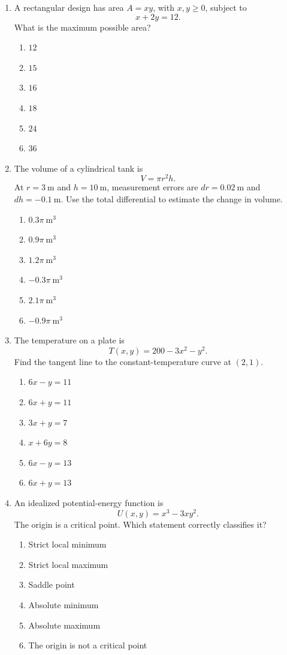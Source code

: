 \documentclass[a4paper,12pt]{article}
\theoremstyle{mystyle}
\numberwithin{equation}{section}
\numberwithin{theorem}{section}
\numberwithin{proposition}{section}
\numberwithin{example}{section}
\numberwithin{remark}{section}
\numberwithin{lemma}{section}
\numberwithin{corollary}{section}
\numberwithin{definition}{section}
\begin{document}
\begin{enumerate}[label=\textbf{Question \arabic*.},leftmargin=*]
\item A rectangular design has area \(A=xy\), with \(x,y\geq0\),
subject to
\[
x+2y=12.
\]
What is the maximum possible area?
\begin{enumerate}[label=(\Alph*)]
\item \(12\)
\item \(15\)
\item \(16\)
\item \(18\)
\item \(24\)
\item \(36\)
\end{enumerate}

\item The volume of a cylindrical tank is
\[
V=\pi r^2h.
\]
At \(r=3\ \mathrm{m}\) and \(h=10\ \mathrm{m}\), measurement errors
are \(dr=0.02\ \mathrm{m}\) and \(dh=-0.1\ \mathrm{m}\). Use the
total differential to estimate the change in volume.
\begin{enumerate}[label=(\Alph*)]
\item \(0.3\pi\ \mathrm{m}^3\)
\item \(0.9\pi\ \mathrm{m}^3\)
\item \(1.2\pi\ \mathrm{m}^3\)
\item \(-0.3\pi\ \mathrm{m}^3\)
\item \(2.1\pi\ \mathrm{m}^3\)
\item \(-0.9\pi\ \mathrm{m}^3\)
\end{enumerate}

\item The temperature on a plate is
\[
T(x,y)=200-3x^2-y^2.
\]
Find the tangent line to the constant-temperature curve at
\((2,1)\).
\begin{enumerate}[label=(\Alph*)]
\item \(6x-y=11\)
\item \(6x+y=11\)
\item \(3x+y=7\)
\item \(x+6y=8\)
\item \(6x-y=13\)
\item \(6x+y=13\)
\end{enumerate}

\item An idealized potential-energy function is
\[
U(x,y)=x^3-3xy^2.
\]
The origin is a critical point. Which statement correctly
classifies it?
\begin{enumerate}[label=(\Alph*)]
\item Strict local minimum
\item Strict local maximum
\item Saddle point
\item Absolute minimum
\item Absolute maximum
\item The origin is not a critical point
\end{enumerate}

\end{enumerate}
\end{document}
